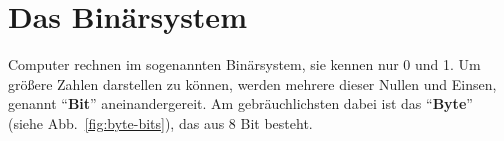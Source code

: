 \section{Das Binärsystem}
\label{sec:grundlagen:binärsystem}

Computer rechnen im sogenannten Binärsystem, sie kennen nur 0 und 1. Um größere Zahlen darstellen zu können, werden mehrere dieser Nullen und Einsen, genannt ``\textbf{Bit}'' aneinandergereit. Am gebräuchlichsten dabei ist das ``\textbf{Byte}'' (siehe Abb.~\ref{fig:byte-bits}), das aus 8 Bit besteht.

\begin{marginfigure}
  \centering
  \caption{Ein Byte mit den Bit-Positionen 0 bis 7.}
  \label{fig:byte-bits}
\end{marginfigure}

